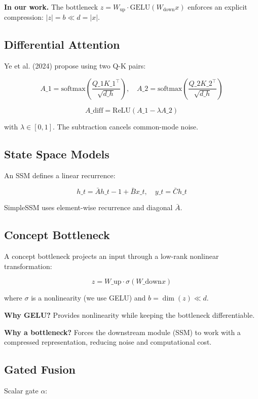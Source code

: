 \textbf{In our work.} The bottleneck $z = W_\text{up} \cdot \text{GELU}(W_\text{down} x)$ 
enforces an explicit compression: $|z| = b \ll d = |x|$.

\subsection{Differential Attention}

Ye et al. (2024) propose using two Q-K pairs:

\[
A\_1 = \text{softmax}\!\left(\frac{Q\_1 K\_1^\top}{\sqrt{d\_h}}\right), \quad
A\_2 = \text{softmax}\!\left(\frac{Q\_2 K\_2^\top}{\sqrt{d\_h}}\right)
\tag{3.2}
\]

\[
A\_\text{diff} = \text{ReLU}(A\_1 - \lambda A\_2)
\tag{3.3}
\]

with $\lambda \in [0, 1]$. The subtraction cancels common-mode noise.

\subsection{State Space Models}

An SSM defines a linear recurrence:

\[
h\_t = \bar{A} h\_{t-1} + \bar{B} x\_t, \quad
y\_t = \bar{C} h\_t
\tag{3.4}
\]

SimpleSSM uses element-wise recurrence and diagonal $\bar{A}$.

\subsection{Concept Bottleneck}

A concept bottleneck projects an input through a low-rank nonlinear 
transformation:

\[
z = W\_\text{up} \cdot \sigma(W\_\text{down} x)
\tag{3.5}
\]

where $\sigma$ is a nonlinearity (we use GELU) and $b = \dim(z) \ll d$.

\textbf{Why GELU?} Provides nonlinearity while keeping the bottleneck 
differentiable.

\textbf{Why a bottleneck?} Forces the downstream module (SSM) to work with a 
compressed representation, reducing noise and computational cost.

\subsection{Gated Fusion}

Scalar gate $\alpha$:

